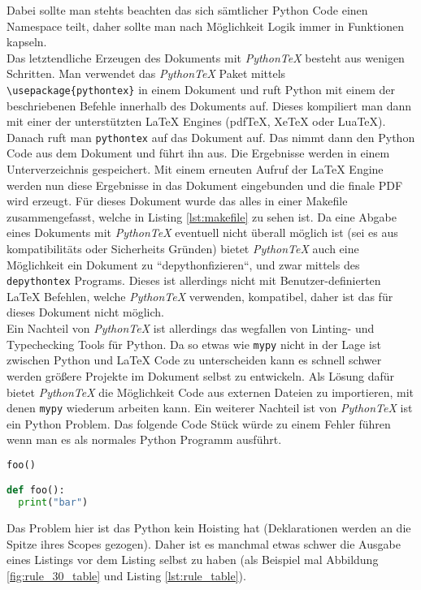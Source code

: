 \documentclass[11pt,a4paper]{article}
\newcommand{\pythontex}{\textit{Python\TeX{}}}
\begin{document}
%
Dabei sollte man stehts beachten das sich sämtlicher Python Code einen Namespace teilt, daher sollte man nach Möglichkeit Logik immer in Funktionen kapseln.
%
\\
%
Das letztendliche Erzeugen des Dokuments mit \pythontex{} besteht aus wenigen Schritten.
%
Man verwendet das \pythontex{} Paket mittels \verb#\usepackage{pythontex}# in einem Dokument und ruft Python mit einem der beschriebenen Befehle innerhalb des Dokuments auf.
%
Dieses kompiliert man dann mit einer der unterstützten \LaTeX{} Engines (pdf\TeX{}, Xe\TeX{} oder Lua\TeX{}).
%
Danach ruft man \texttt{pythontex} auf das Dokument auf.
%
Das nimmt dann den Python Code aus dem Dokument und führt ihn aus.
%
Die Ergebnisse werden in einem Unterverzeichnis gespeichert.
%
Mit einem erneuten Aufruf der \LaTeX{} Engine werden nun diese Ergebnisse in das Dokument eingebunden und die finale PDF wird erzeugt.
%
Für dieses Dokument wurde das alles in einer Makefile zusammengefasst, welche in Listing \ref{lst:makefile} zu sehen ist.
%
Da eine Abgabe eines Dokuments mit \pythontex{} eventuell nicht überall möglich ist (sei es aus kompatibilitäts oder Sicherheits Gründen) bietet \pythontex{} auch eine Möglichkeit ein Dokument zu ``depythonfizieren``, und zwar mittels des \texttt{depythontex} Programs.
%
Dieses ist allerdings nicht mit Benutzer-definierten \LaTeX{} Befehlen, welche \pythontex{} verwenden, kompatibel, daher ist das für dieses Dokument nicht möglich.
\\
%
Ein Nachteil von \pythontex{} ist allerdings das wegfallen von Linting- und Typechecking Tools für Python.
%
Da so etwas wie \texttt{mypy} nicht in der Lage ist zwischen Python und \LaTeX{} Code zu unterscheiden kann es schnell schwer werden größere Projekte im Dokument selbst zu entwickeln.
%
Als Lösung dafür bietet \pythontex{} die Möglichkeit Code aus externen Dateien zu importieren, mit denen \texttt{mypy} wiederum arbeiten kann.
%
Ein weiterer Nachteil ist von \pythontex{} ist ein Python Problem.
%
Das folgende Code Stück würde zu einem Fehler führen wenn man es als normales Python Programm ausführt.
%
\begin{lstlisting}[language=Python]
foo()

def foo():
  print("bar")
\end{lstlisting}
%
Das Problem hier ist das Python kein Hoisting hat (Deklarationen werden an die Spitze ihres Scopes gezogen).
%
Daher ist es manchmal etwas schwer die Ausgabe eines Listings vor dem Listing selbst zu haben (als Beispiel mal Abbildung \ref{fig:rule_30_table} und Listing \ref{lst:rule_table}).
\end{document}
